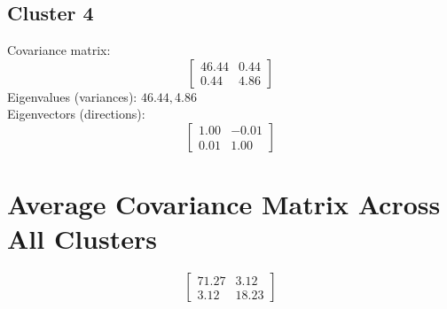 \documentclass{article}
\begin{document}
\subsection*{Cluster 4}
Covariance matrix:
\[\begin{bmatrix}46.44 & 0.44 \\0.44 & 4.86\end{bmatrix}\]
Eigenvalues (variances): $ 46.44, $4.86\\
Eigenvectors (directions):
\[\begin{bmatrix}1.00 & -0.01 \\0.01 & 1.00\end{bmatrix}\]
\section*{Average Covariance Matrix Across All Clusters}
\[\begin{bmatrix}71.27 & 3.12 \\3.12 & 18.23\end{bmatrix}\]
\end{document}
